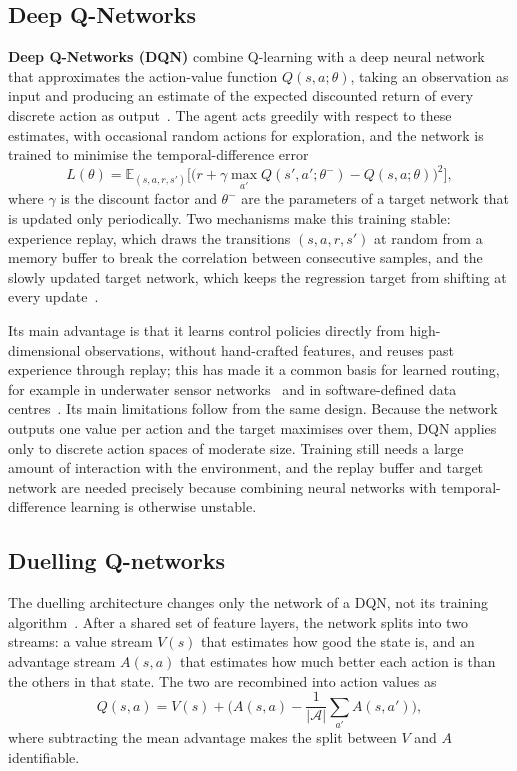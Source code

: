 \subsection{Deep Q-Networks}
\label{sec:dqn}

\textbf{Deep Q-Networks (DQN)} combine Q-learning with a deep neural network that
approximates the action-value function $Q(s,a;\theta)$, taking an observation as input
and producing an estimate of the expected discounted return of every discrete action
as output~\cite{mnih2013playingatarideepreinforcement,mnih2015human}. The agent acts
greedily with respect to these estimates, with occasional random actions for
exploration, and the network is trained to minimise the temporal-difference error
\begin{equation}
L(\theta) = \mathbb{E}_{(s,a,r,s')}\Big[ \big( r + \gamma \max_{a'} Q(s', a'; \theta^{-}) - Q(s, a; \theta) \big)^2 \Big],
\end{equation}
where $\gamma$ is the discount factor and $\theta^{-}$ are the parameters of a target
network that is updated only periodically. Two mechanisms make this training stable:
experience replay, which draws the transitions $(s,a,r,s')$ at random from a memory
buffer to break the correlation between consecutive samples, and the slowly updated
target network, which keeps the regression target from shifting at every
update~\cite{mnih2015human}.

Its main advantage is that it learns control policies directly from high-dimensional
observations, without hand-crafted features, and reuses past experience through replay;
this has made it a common basis for learned routing, for example in underwater sensor
networks~\cite{10012647} and in software-defined data centres~\cite{9105030}. Its main
limitations follow from the same design. Because the network outputs one value per
action and the target maximises over them, DQN applies only to discrete action spaces
of moderate size. Training still needs a large amount of interaction with the
environment, and the replay buffer and target network are needed precisely because
combining neural networks with temporal-difference learning is otherwise unstable.

\subsection{Duelling Q-networks}
\label{subsec:duelling_dqn}

The duelling architecture changes only the network of a DQN, not its training
algorithm~\cite{wang2016duelingnetworkarchitecturesdeep}. After a shared set of feature
layers, the network splits into two streams: a value stream $V(s)$ that estimates how
good the state is, and an advantage stream $A(s,a)$ that estimates how much better each
action is than the others in that state. The two are recombined into action values as
\begin{equation}
Q(s,a) = V(s) + \Big( A(s,a) - \frac{1}{|\mathcal{A}|} \sum_{a'} A(s,a') \Big),
\end{equation}
where subtracting the mean advantage makes the split between $V$ and $A$ identifiable.


